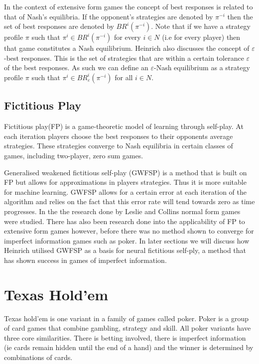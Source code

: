 In the context of extensive form games the concept of best responses is related to that of Nash's equilibria.
If the opponent's strategies are denoted by $\pi^{-i}$ then the set of best responses are denoted by
$BR^i(\pi^{-i})$.
Note that if we have a strategy profile $\pi$ such that $\pi^i\in BR^i(\pi^{-i})$ for every $i\in N$ (i.e
for every player) then that game constitutes a Nash equilibrium\citep{heinrich2017reinforcement}.
Heinrich also discusses the concept of $\varepsilon$-best responses.
This is the set of strategies that are within a certain tolerance $\varepsilon$ of the best responses.
As such we can define an $\varepsilon$-Nash equilibrium as a strategy profile $\pi$ such that
$\pi^i \in BR^i_\varepsilon (\pi^{-i})$ for all $i\in N$.

\subsection{Fictitious Play}\label{subsec:fictitiousPlay}
Fictitious play(FP) is a game-theoretic model of learning through self-play.
At each iteration players choose the best responses to their opponents average
strategies\citep{heinrich2017reinforcement}.
These strategies converge to Nash equilibria in certain classes of games, including two-player, zero sum games.

Generalised weakened fictitious self-play (GWFSP) is a method that is built on FP but allows for approximations
in players strategies\citep{leslie2006generalised}.
Thus it is more suitable for machine learning.
GWFSP allows for a certain error at each iteration of the algorithm and relies on the fact that this
error rate will tend towards zero as time progresses.
In the the research done by Leslie and Collins normal form games were studied.
There has also been research done into the applicability of FP to extensive form games however,
before\citep{heinrich2016deep} there was no method shown to converge for imperfect information games such as poker.
In later sections we will discuss how Heinrich utilised GWFSP as a basis for neural fictitious self-ply,
a method that has shown success in games of imperfect information.

\section{Texas Hold'em}\label{sec:thIntro}
Texas hold'em is one variant in a family of games called poker.
Poker is a group of card games that combine gambling, strategy and skill.
All poker variants have three core similarities.
There is betting involved, there is imperfect information (ie cards remain hidden until the end of a hand)
and the winner is determined by combinations of cards.

